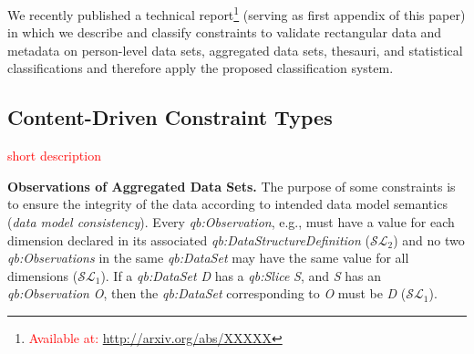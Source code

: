 \documentclass{llncs}
\newcommand{\tb}[1]{\todo[size=\small, color=green!40]{\textbf{Thomas:} #1}}
\begin{document}
We recently published a technical report\footnote{\textcolor{red}{\label{technical-report-1}Available at: \url{http://arxiv.org/abs/XXXXX}}} (serving as first appendix of this paper) in which we describe and classify constraints to validate rectangular data and metadata on person-level data sets, aggregated data sets, thesauri, and statistical classifications and therefore apply the proposed classification system.

%
%
%

%


\subsection{Content-Driven Constraint Types}
\label{content-driven-validation}

\textcolor{red}{short description}

\textbf{Observations of Aggregated Data Sets.}
The purpose of some constraints is to ensure the integrity of
the data according to intended data model semantics (\emph{data model consistency}).
Every \emph{qb:Observation}, e.g., must have a value for each dimension
declared in its associated \emph{qb:DataStructureDefinition} ($\mathcal{SL}_{2}$)
and no two \emph{qb:Observations} in the same \emph{qb:DataSet}
may have the same value for all dimensions ($\mathcal{SL}_{1}$).
If a \emph{qb:DataSet} \emph{D} has a \emph{qb:Slice} \emph{S}, and \emph{S} has an
\emph{qb:Observation} \emph{O}, then the \emph{qb:DataSet} corresponding to \emph{O} must be \emph{D} ($\mathcal{SL}_{1}$).

%
%
\end{document}
